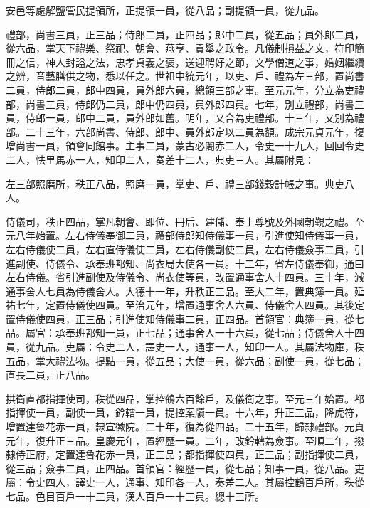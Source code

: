 \begin{pinyinscope}
 安邑等處解鹽管民提領所，正提領一員，從八品；副提領一員，從九品。



 禮部，尚書三員，正三品；侍郎二員，正四品；郎中二員，從五品；員外郎二員，從六品，掌天下禮樂、祭祀、朝會、燕享、貢舉之政令。凡儀制損益之文，符印簡冊之信，神人封謚之法，忠孝貞義之褒，送迎聘好之節，文學僧道之事，婚姻繼續之辨，音藝膳供之物，悉以任之。世祖中統元年，以吏、戶、禮為左三部，置尚書二員，侍郎二員，郎中四員，員外郎六員，總領三部之事。至元元年，分立為吏禮部，尚書三員，侍郎仍二員，郎中仍四員，員外郎四員。七年，別立禮部，尚書三員，侍郎一員，郎中二員，員外郎如舊。明年，又合為吏禮部。十三年，又別為禮部。二十三年，六部尚書、侍郎、郎中、員外郎定以二員為額。成宗元貞元年，復增尚書一員，領會同館事。主事二員，蒙古必闍赤二人，令史一十九人，回回令史二人，怯里馬赤一人，知印二人，奏差十二人，典吏三人。其屬附見：



 左三部照磨所，秩正八品，照磨一員，掌吏、戶、禮三部錢穀計帳之事。典吏八人。



 侍儀司，秩正四品，掌凡朝會、即位、冊后、建儲、奉上尊號及外國朝覲之禮。至元八年始置。左右侍儀奉御二員，禮部侍郎知侍儀事一員，引進使知侍儀事一員，左右侍儀使二員，左右直侍儀使二員，左右侍儀副使二員，左右侍儀僉事二員，引進副使、侍儀令、承奉班都知、尚衣局大使各一員。十二年，省左侍儀奉御，通曰左右侍儀。省引進副使及侍儀令、尚衣使等員，改置通事舍人十四員。三十年，減通事舍人七員為侍儀舍人。大德十一年，升秩正三品。至大二年，置典簿一員。延祐七年，定置侍儀使四員。至治元年，增置通事舍人六員、侍儀舍人四員。其後定置侍儀使四員，正三品；引進使知侍儀事二員，正四品。首領官：典簿一員，從七品。屬官：承奉班都知一員，正七品；通事舍人一十六員，從七品；侍儀舍人十四員，從九品。吏屬：令史二人，譯史一人，通事一人，知印一人。其屬法物庫，秩五品，掌大禮法物。提點一員，從五品；大使一員，從六品；副使一員，從七品；直長二員，正八品。



 拱衛直都指揮使司，秩從四品，掌控鶴六百餘戶，及儀衛之事。至元三年始置。都指揮使一員，副使一員，鈐轄一員，提控案牘一員。十六年，升正三品，降虎符，增置達魯花赤一員，隸宣徽院。二十年，復為從四品。二十五年，歸隸禮部。元貞元年，復升正三品。皇慶元年，置經歷一員。二年，改鈐轄為僉事。至順二年，撥隸侍正府，定置達魯花赤一員，正三品；都指揮使四員，正三品；副指揮使二員，從三品；僉事二員，正四品。首領官：經歷一員，從七品；知事一員，從八品。吏屬：令史四人，譯史一人，通事、知印各一人，奏差二人。其屬控鶴百戶所，秩從七品。色目百戶一十三員，漢人百戶一十三員。總十三所。




\end{pinyinscope}
